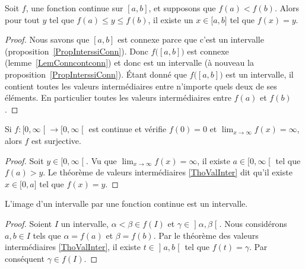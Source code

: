 \begin{theorem}        \label{ThoValInter}
	Soit \( f\), une fonction continue sur \( [a,b]\), et supposons que \( f(a)<f(b)\). Alors pour tout \( y\) tel que \( f(a)\leq y\leq f(b)\), il existe un \( x\in\mathopen[ a , b \mathclose]\) tel que \( f(x)=y\).
\end{theorem}

\begin{proof}
	Nous savons que \( [a,b]\) est connexe parce que c'est un intervalle (proposition~\ref{PropInterssiConn}). Donc \( f\big( [a,b] \big)\) est connexe (lemme~\ref{LemConncontconn}) et donc est un intervalle (à nouveau la proposition~\ref{PropInterssiConn}). Étant donné que \( f\big( [a,b] \big)\) est un intervalle, il contient toutes les valeurs intermédiaires entre n'importe quels deux de ses éléments. En particulier toutes les valeurs intermédiaires entre \( f(a)\) et \( f(b)\).
\end{proof}


\begin{proposition}	\label{PROPooIJZWooCAFPRn}
	Si \( f\colon \mathopen[ 0 , \infty \mathclose[\to \mathopen[ 0 , \infty \mathclose[\) est continue et vérifie \( f(0)=0\) et \( \lim_{x\to \infty} f(x)=\infty\), alors \( f\) est surjective.
\end{proposition}

\begin{proof}
	Soit \( y\in \mathopen[ 0 , \infty \mathclose[\). Vu que \( \lim_{x\to\infty}f(x)=\infty\), il existe \( a\in\mathopen[ 0 , \infty \mathclose[\) tel que \( f(a)>y\). Le théorème de valeurs intermédiaires \ref{ThoValInter} dit qu'il existe \( x\in \mathopen[ 0 , a \mathclose]\) tel que \( f(x)=y\).
\end{proof}


\begin{corollary}       \label{CorImInterInter}
	L'image d'un intervalle par une fonction continue est un intervalle.
\end{corollary}

\begin{proof}
	Soient \( I\) un intervalle, \( \alpha<\beta\in f(I)\) et \( \gamma\in\mathopen] \alpha , \beta \mathclose[\). Nous considérons \(a,b\in I\) tels que \( \alpha=f(a)\) et \( \beta=f(b)\). Par le théorème des valeurs intermédiaires \ref{ThoValInter}, il existe \( t\in\mathopen] a , b \mathclose[\) tel que \( f(t)=\gamma\). Par conséquent \( \gamma\in f(I)\).
\end{proof}

